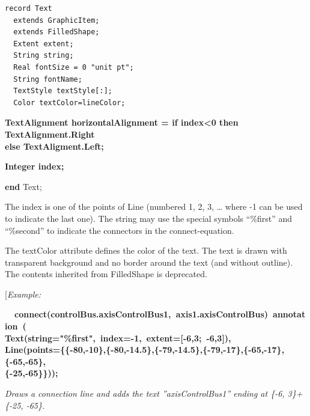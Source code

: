 \documentclass[10pt,a4paper]{report}
\begin{document}
\begin{lstlisting}[language=modelica]
record Text
  extends GraphicItem;
  extends FilledShape;
  Extent extent;
  String string;
  Real fontSize = 0 "unit pt";
  String fontName;
  TextStyle textStyle[:];
  Color textColor=lineColor;
\end{lstlisting}
\textbf{TextAlignment horizontalAlignment = if index\textless{}0 then
TextAlignment.Right\\
else TextAligment.Left;}

\textbf{Integer index;}

\textbf{end} Text;

The index is one of the points of Line (numbered 1, 2, 3, \ldots{} where
-1 can be used to indicate the last one). The string may use the special
symbols ``\%first'' and ``\%second'' to indicate the connectors in the
connect-equation.

The textColor attribute defines the color of the text. The text is drawn
with transparent background and no border around the text (and without
outline). The contents inherited from FilledShape is deprecated.

{[}\emph{Example:}

\textbf{~~connect(controlBus.axisControlBus1,~axis1.axisControlBus)~annotation~(\\
\hspace*{0.333em}\hspace*{0.333em}\hspace*{0.333em}\hspace*{0.333em}Text(string="\%first",~index=-1,~extent={[}-6,3;~-6,3{]}),~\\
Line(points=\{\{-80,-10\},\{-80,-14.5\},\{-79,-14.5\},\{-79,-17\},\{-65,-17\},\{-65,-65\},\\
\hspace*{0.333em}\hspace*{0.333em}\hspace*{0.333em}\hspace*{0.333em}\hspace*{0.333em}\hspace*{0.333em}\hspace*{0.333em}\hspace*{0.333em}\hspace*{0.333em}\hspace*{0.333em}\{-25,-65\}\}));}

\emph{Draws a connection line and adds the text ''axisControlBus1''
ending at \{-6, 3\}+\{-25, -65\}.}
\end{document}
